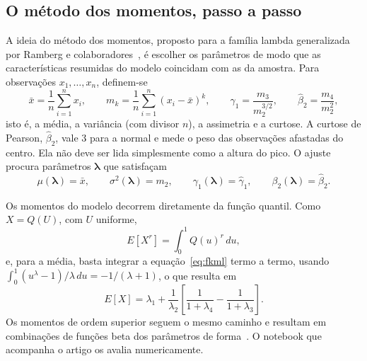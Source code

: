 \subsection{O método dos momentos, passo a passo}

A ideia do método dos momentos, proposto para a família lambda generalizada por Ramberg e colaboradores~\cite{ramberg1979}, é escolher os parâmetros de modo que as características resumidas do modelo coincidam com as da amostra. Para observações $x_1, \ldots, x_n$, definem-se
\begin{equation}
    \bar x = \frac{1}{n}\sum_{i=1}^{n} x_i, \qquad
    m_k = \frac{1}{n}\sum_{i=1}^{n} (x_i - \bar x)^k, \qquad
    \widehat\gamma_1 = \frac{m_3}{m_2^{3/2}}, \qquad
    \widehat\beta_2 = \frac{m_4}{m_2^{2}},
    \label{eq:momentos_amostra}
\end{equation}
isto é, a média, a variância (com divisor $n$), a assimetria e a curtose. A curtose de Pearson, $\widehat\beta_2$, vale $3$ para a normal e mede o peso das observações afastadas do centro. Ela não deve ser lida simplesmente como a altura do pico. O ajuste procura parâmetros $\boldsymbol\lambda$ que satisfaçam
\begin{equation}
    \mu(\boldsymbol\lambda) = \bar x, \qquad
    \sigma^2(\boldsymbol\lambda) = m_2, \qquad
    \gamma_1(\boldsymbol\lambda) = \widehat\gamma_1, \qquad
    \beta_2(\boldsymbol\lambda) = \widehat\beta_2.
    \label{eq:sistema}
\end{equation}

Os momentos do modelo decorrem diretamente da função quantil. Como $X = Q(U)$, com $U$ uniforme,
\begin{equation}
    E[X^r] = \int_0^1 Q(u)^r \, du,
\end{equation}
e, para a média, basta integrar a equação~\eqref{eq:fkml} termo a termo, usando $\int_0^1 (u^{\lambda} - 1)/\lambda \, du = -1/(\lambda + 1)$, o que resulta em
\begin{equation}
    E[X] = \lambda_1 + \frac{1}{\lambda_2}
    \left[\frac{1}{1 + \lambda_4} - \frac{1}{1 + \lambda_3}\right].
    \label{eq:media}
\end{equation}
Os momentos de ordem superior seguem o mesmo caminho e resultam em combinações de funções beta dos parâmetros de forma~\cite{freimer1988,karian2011}. O notebook que acompanha o artigo os avalia numericamente.

